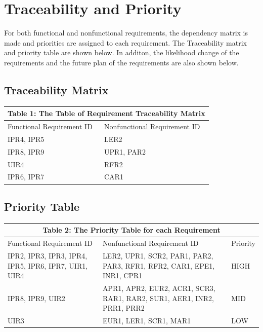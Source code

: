 \documentclass[12pt]{article}
\begin{document}
\section{Traceability and Priority}
For both functional and nonfunctional requirements, the dependency matrix is made and priorities are assigned to each requirement. The Traceability matrix and priority table are shown below. In additon, the likelihood change of the requirements and the future plan of the requirements are also shown below.

\subsection{Traceability Matrix}
\begin{tabular}{|p{}| p{}|}
\hline \multicolumn{2}{|c|}{Table 1: The Table of Requirement Traceability Matrix}\\

\hline Functional Requirement ID&Nonfunctional Requirement ID\\

\hline IPR4, IPR5&LER2\\

\hline IPR8, IPR9&UPR1, PAR2\\
\hline UIR4&RFR2\\
\hline IPR6, IPR7&CAR1\\
\hline

\end{tabular}

\subsection{Priority Table}
\begin{tabular}{|p{}|p{}|p{}|}

\hline \multicolumn{3}{|c|}{Table 2: The Priority Table for each Requirement}\\

\hline Functional Requirement ID&Nonfunctional Requirement ID&Priority\\

\hline IPR2, IPR3, IPR3, IPR4, IPR5, IPR6, IPR7, UIR1, UIR4&LER2, UPR1, SCR2, PAR1, PAR2, PAR3, RFR1, RFR2, CAR1, EPE1, INR1, CPR1&HIGH\\

\hline IPR8, IPR9, UIR2&APR1, APR2, EUR2, ACR1, SCR3, RAR1, RAR2, SUR1, AER1, INR2, PRR1, PRR2&MID\\

\hline UIR3&EUR1, LER1, SCR1, MAR1&LOW\\

\hline

\end{tabular}
\end{document}
